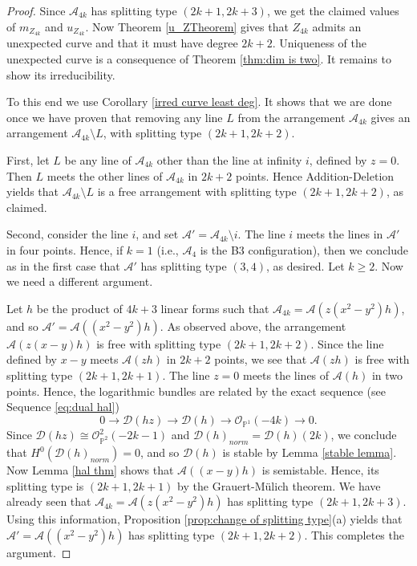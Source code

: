 \documentclass[12pt]{amsart}
\numberwithin{equation}{section}
\theoremstyle{definition}
\begin{document}
\begin{proof}
Since ${\mathcal{A}}_{4k}$ has splitting type $(2k+1,2k+3)$, we get the claimed  values of $m_{Z_{4k}}$ and $u_{Z_{4k}}$. Now Theorem \ref{u_ZTheorem} gives that $Z_{4k}$ admits an unexpected curve  and that it must have degree $2 k+2$. Uniqueness of the unexpected curve is a consequence of Theorem \ref{thm:dim is two}. It remains to show its irreducibility. 

To this end we use Corollary \ref{irred curve least deg}. It shows that we are done once we have proven that removing any line $L$ from the arrangement ${\mathcal{A}}_{4k}$ gives an arrangement  ${\mathcal{A}}_{4k}\setminus L$, with splitting type $(2k+1, 2k+2)$. 

First, let $L$ be any line of ${\mathcal{A}}_{4k}$ other than the line at infinity $i$, defined by $z = 0$. Then $L$ meets the other lines of ${\mathcal{A}}_{4k}$ in $2k + 2$ points. Hence Addition-Deletion yields that ${\mathcal{A}}_{4k} \setminus L$ is a free arrangement with splitting type $(2k+1, 2k+2)$, as claimed. 

Second, consider the line $i$, and set  ${\mathcal{A}}' = {\mathcal{A}}_{4k} \setminus i$. The line $i$ meets the lines in ${\mathcal{A}}'$ in four points. Hence, if $k = 1$ (i.e., ${\mathcal{A}}_4$ is the B3 configuration), then we conclude as in the first case that ${\mathcal{A}}'$ has splitting type $(3, 4)$, as desired. Let $k \ge 2$. Now we need a different argument. 

Let $h$ be the product of $4 k + 3$ linear forms such that ${\mathcal{A}}_{4k} = {\mathcal{A}} (z (x^2 - y^2) h)$, and so ${\mathcal{A}}' = {\mathcal{A}} ( (x^2 - y^2) h)$. As observed above, the arrangement  ${\mathcal{A}} (z (x - y) h)$ is free with splitting type $(2k+1, 2k+2)$. Since the line defined by $x-y$ meets ${\mathcal{A}} (z h)$ in $2k+2$ points, we see that ${\mathcal{A}} (z h)$ is free with splitting type $(2k+1, 2k+1)$. The line $z = 0$ meets the lines of ${\mathcal{A}} (h)$ in two points. Hence, the logarithmic bundles are related by the exact sequence (see Sequence \ref{eq:dual hal})
\[
0 \to {\mathcal{D}} (h z) \to {\mathcal{D}} (h) \to {\mathcal{O}}_{{ \ensuremath{\mathbb{P}}}^1} (-4 k) \to 0. 
\]
Since ${\mathcal{D}} (h z) \cong {\mathcal{O}}_{{ \ensuremath{\mathbb{P}}}^2}^2 (-2k-1)$ and ${\mathcal{D}} (h)_{norm} = {\mathcal{D}} (h) (2k)$, we conclude that $H^0 ({\mathcal{D}} (h)_{norm}) = 0$, and so ${\mathcal{D}} (h)$ is stable by Lemma \ref{stable lemma}. Now Lemma \ref{hal thm} shows that ${\mathcal{A}} ((x - y)h)$ is semistable. Hence, its splitting type is $(2k+1, 2k +1)$ by the Grauert-M\"ulich theorem. We have already seen that ${\mathcal{A}}_{4k} = {\mathcal{A}} (z (x^2 - y^2) h)$ has splitting type $(2k+1, 2k+3)$. Using this information, Proposition \ref{prop:change of splitting type}(a) yields that ${\mathcal{A}}' = {\mathcal{A}} ( (x^2 - y^2) h)$ has splitting type $(2k+1, 2k+2)$. This completes the argument.  
\end{proof}
\end{document}
